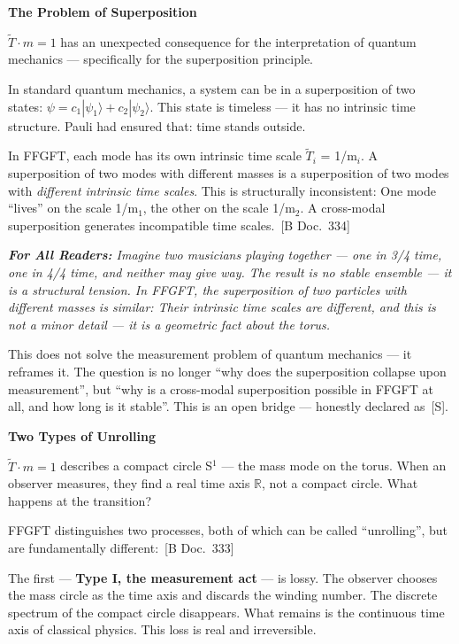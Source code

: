 \documentclass[11pt,oneside]{book}
\newcommand{\status}[1]{\penalty10000\,{\scriptsize\textcolor{gray!60}{[#1]}}}
\newenvironment{laierspur}{%
  \par\vspace{4pt}%
  \noindent\small\itshape\color{blue!60!black}%
  \textbf{For All Readers:}\enspace\ignorespaces}{%
  \par\vspace{4pt}\normalsize\normalfont\normalcolor}
\begin{document}
\textbf{The Problem of Superposition}

$\tilde{T}\cdot m = 1$ has an unexpected consequence for the interpretation of
quantum mechanics — specifically for the superposition principle.

In standard quantum mechanics, a system can be in a superposition of two
states: $\psi = c_1|\psi_1\rangle + c_2|\psi_2\rangle$. This state is timeless
— it has no intrinsic time structure. Pauli had ensured that: time stands
outside.

In FFGFT, each mode has its own intrinsic time scale $\tilde{T}_i$ = 1/m$_i$.
A superposition of two modes with different masses is a superposition of two
modes with \textit{different intrinsic time scales}. This is structurally
inconsistent: One mode \enquote{lives} on the scale 1/m$_1$, the other on the scale
1/m$_2$. A cross-modal superposition generates incompatible time scales. \status{B Doc.~334}

\begin{laierspur}
Imagine two musicians playing together — one in 3/4 time, one in 4/4
time, and neither may give way. The result is no stable ensemble — it is a
structural tension. In FFGFT, the superposition of two particles with
different masses is similar: Their intrinsic time scales are different, and
this is not a minor detail — it is a geometric fact about the torus.
\end{laierspur}

This does not solve the measurement problem of quantum mechanics — it reframes
it. The question is no longer \enquote{why does the superposition collapse upon
measurement}, but \enquote{why is a cross-modal superposition possible in FFGFT at
all, and how long is it stable}. This is an open bridge — honestly declared
as \status{S}.

\textbf{Two Types of Unrolling}

$\tilde{T}\cdot m = 1$ describes a compact circle S$^1$ — the mass mode on the
torus. When an observer measures, they find a real time axis $\mathbb{R}$, not a
compact circle. What happens at the transition?

FFGFT distinguishes two processes, both of which can be called \enquote{unrolling},
but are fundamentally different: \status{B Doc.~333}

The first — \textbf{Type I, the measurement act} — is lossy. The observer
chooses the mass circle as the time axis and discards the winding number.
The discrete spectrum of the compact circle disappears. What remains is the
continuous time axis of classical physics. This loss is real and irreversible.
\end{document}

